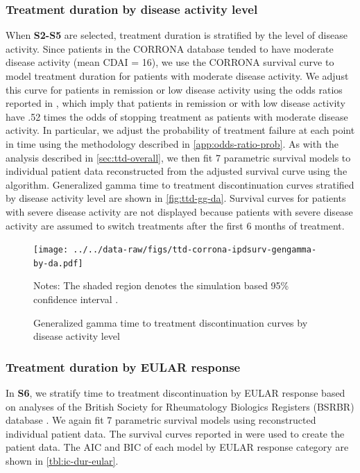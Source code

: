 \documentclass[11pt,final,fleqn]{article}\usepackage[]{graphicx}\usepackage[]{color}
\theoremstyle{plain}
\begin{document}
\subsubsection{Treatment duration by disease activity level}\label{ttd-da}
When \textbf{S2-S5} are selected, treatment duration is stratified by the level of disease activity. Since patients in the CORRONA database tended to have moderate disease activity (mean CDAI = 16), we use the CORRONA survival curve to model treatment duration for patients with moderate disease activity. We adjust this curve for patients in remission or low disease activity using the odds ratios reported in \citet{zhang2011thresholds}, which imply that patients in remission or with low disease activity have .52 times the odds of stopping treatment as patients with moderate disease activity. In particular, we adjust the probability of treatment failure at each point in time using the methodology described in \autoref{app:odds-ratio-prob}. As with the analysis described in \autoref{sec:ttd-overall}, we then fit 7 parametric survival models to individual patient data reconstructed from the adjusted survival curve using the \citet{guyot2012enhanced} algorithm. Generalized gamma time to treatment discontinuation curves stratified by disease activity level are shown in \autoref{fig:ttd-gg-da}. Survival curves for patients with severe disease activity are not displayed because patients with severe disease activity are assumed to switch treatments after the first 6 months of treatment.

\begin{figure}[H]
\centering
\texttt{[image: ../../data-raw/figs/ttd-corrona-ipdsurv-gengamma-by-da.pdf]}
\caption{Generalized gamma time to treatment discontinuation curves by disease activity level}\label{fig:ttd-gg-da}
\begin{minipage}{\linewidth}
\footnotesize
Notes: The shaded region denotes the simulation based 95\% confidence interval \citep{mandel2013simulation}.
\end{minipage}
\end{figure}

\subsubsection{Treatment duration by EULAR response} \label{ttd-eular}
In \textbf{S6}, we stratify time to treatment discontinuation by EULAR response based on analyses of the British Society for Rheumatology Biologics Registers (BSRBR) database \citep{stevenson2016adalimumab}. We again fit 7 parametric survival models using reconstructed individual patient data. The survival curves reported in \citet{stevenson2016adalimumab} were used to create the patient data. The AIC and BIC of each model by EULAR response category are shown in \autoref{tbl:ic-dur-eular}.
\end{document}
